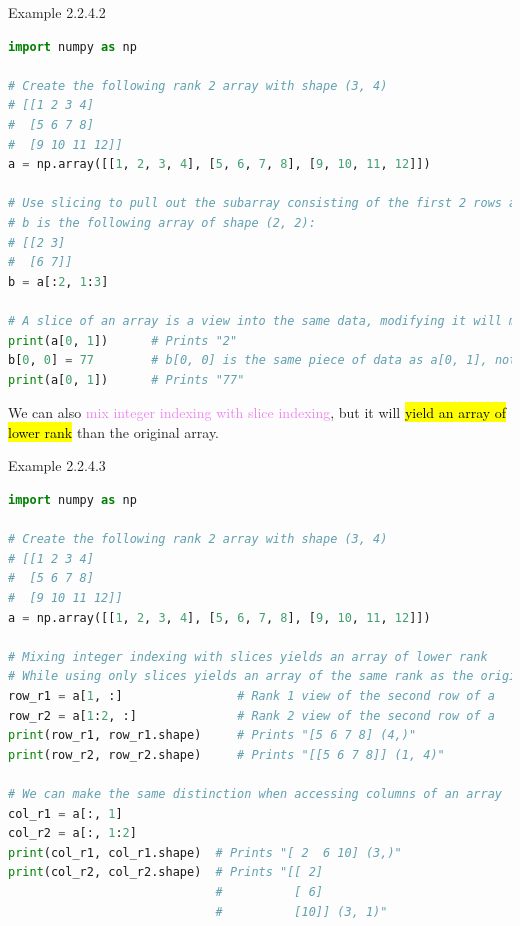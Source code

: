 \documentclass{book}
\begin{document}
\begin{egBox}{Example 2.2.4.2}{}
    \begin{lstlisting}[language=Python, basicstyle=\ttfamily\small, keywordstyle=\color{blue}, commentstyle=\color{forestgreen}, stringstyle=\color{red}, showstringspaces=false]
import numpy as np

# Create the following rank 2 array with shape (3, 4)
# [[1 2 3 4]
#  [5 6 7 8]
#  [9 10 11 12]]
a = np.array([[1, 2, 3, 4], [5, 6, 7, 8], [9, 10, 11, 12]])

# Use slicing to pull out the subarray consisting of the first 2 rows and columns 1 and 2
# b is the following array of shape (2, 2):
# [[2 3]
#  [6 7]]
b = a[:2, 1:3]

# A slice of an array is a view into the same data, modifying it will modify the original array.
print(a[0, 1])      # Prints "2"
b[0, 0] = 77        # b[0, 0] is the same piece of data as a[0, 1], not a copy.
print(a[0, 1])      # Prints "77"     
    \end{lstlisting}
\end{egBox}
We can also \textcolor{violet}{mix integer indexing with slice indexing}, but it will \hl{yield an array of lower rank} than the original array.
\begin{egBox}{Example 2.2.4.3}{}
    \begin{lstlisting}[language=Python, basicstyle=\ttfamily\small, keywordstyle=\color{blue}, commentstyle=\color{forestgreen}, stringstyle=\color{red}, showstringspaces=false]
import numpy as np

# Create the following rank 2 array with shape (3, 4)
# [[1 2 3 4]
#  [5 6 7 8]
#  [9 10 11 12]]
a = np.array([[1, 2, 3, 4], [5, 6, 7, 8], [9, 10, 11, 12]])

# Mixing integer indexing with slices yields an array of lower rank
# While using only slices yields an array of the same rank as the original array
row_r1 = a[1, :]                # Rank 1 view of the second row of a
row_r2 = a[1:2, :]              # Rank 2 view of the second row of a
print(row_r1, row_r1.shape)     # Prints "[5 6 7 8] (4,)"
print(row_r2, row_r2.shape)     # Prints "[[5 6 7 8]] (1, 4)"

# We can make the same distinction when accessing columns of an array
col_r1 = a[:, 1]
col_r2 = a[:, 1:2]
print(col_r1, col_r1.shape)  # Prints "[ 2  6 10] (3,)"
print(col_r2, col_r2.shape)  # Prints "[[ 2]
                             #          [ 6]
                             #          [10]] (3, 1)"
    \end{lstlisting}
\end{egBox}
\end{document}
